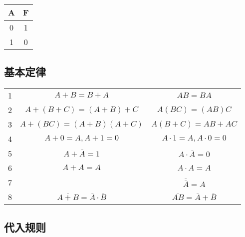 \begin{enumerate}
          \begin{table}[!htbp]
              \centering
              \begin{tabular}{c|c}
                  \toprule
                  A & F \\
                  \midrule
                  0 & 1 \\
                  1 & 0 \\
                  \bottomrule
              \end{tabular}
          \end{table}

\end{enumerate}

\newpage

\subsection{基本定律}

\begin{table}[!htbp]
    \centering
    \begin{tabular}{c|c|c}
        \toprule
        1 & $A+B=B+A$                                      & $AB=BA$                                 \\
        2 & $A+(B+C)=(A+B)+C$                              & $A(BC)=(AB)C$                           \\
        3 & $A+(BC)=(A+B)(A+C)$                            & $A(B+C)=AB+AC$                          \\
        4 & $A+0=A , A+1=0$                                & $A \cdot 1=A , A \cdot 0=0$             \\
        5 & $A+\overline A =1$                             & $A \cdot \overline A  =0$               \\
        6 & $A+A=A$                                        & $A \cdot A=A$                           \\
        7 &                                                & $\overline{\overline A}=A$              \\
        8 & $\overline{A+B}=\overline A \cdot \overline B$ & $\overline{AB}=\overline A+\overline B$ \\
        \bottomrule
    \end{tabular}
\end{table}

\newpage

\subsection{代入规则}

